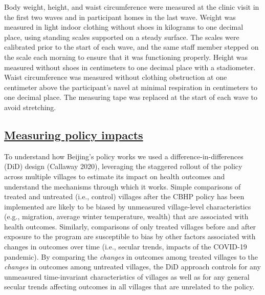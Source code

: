 \documentclass[
  letterpaper,
  DIV=11,
  numbers=noendperiod]{scrartcl}
\providecommand{\DIFadd}[1]{{\protect\color{blue}\underline{#1}}} %
\providecommand{\DIFaddbegin}{} %
\providecommand{\DIFaddend}{} %
\providecommand{\DIFdelbegin}{} %
\providecommand{\DIFdelend}{} %
\newcommand{\DIFscaledelfig}{0.5}
\newlength{\DIFdelgraphicswidth} %
\newlength{\DIFdelgraphicsheight} %
\newcommand{\DIFaddincludegraphics}[2][]{{\color{blue}\fbox{\DIFOincludegraphics[#1]{#2}}}} %
\newcommand{\DIFdelincludegraphics}[2][]{%
\sbox{\DIFdelgraphicsbox}{\DIFOincludegraphics[#1]{#2}}%
\settoboxwidth{\DIFdelgraphicswidth}{\DIFdelgraphicsbox} %
\settoboxtotalheight{\DIFdelgraphicsheight}{\DIFdelgraphicsbox} %
\scalebox{\DIFscaledelfig}{%
\parbox[b]{\DIFdelgraphicswidth}{\usebox{\DIFdelgraphicsbox}\\[-\baselineskip] \rule{\DIFdelgraphicswidth}{0em}}\llap{\resizebox{\DIFdelgraphicswidth}{\DIFdelgraphicsheight}{%
\setlength{\unitlength}{\DIFdelgraphicswidth}%
\begin{picture}(1,1)%
\thicklines\linethickness{2pt} %
{\color[rgb]{1,0,0}\put(0,0){\framebox(1,1){}}}%
{\color[rgb]{1,0,0}\put(0,0){\line( 1,1){1}}}%
{\color[rgb]{1,0,0}\put(0,1){\line(1,-1){1}}}%
\end{picture}%
}\hspace*{3pt}}} %
} %
\DeclareRobustCommand{\DIFaddbegin}{\DIFOaddbegin \let\includegraphics\DIFaddincludegraphics} %
\DeclareRobustCommand{\DIFaddend}{\DIFOaddend \let\includegraphics\DIFOincludegraphics} %
\DeclareRobustCommand{\DIFdelbegin}{\DIFOdelbegin \let\includegraphics\DIFdelincludegraphics} %
\DeclareRobustCommand{\DIFdelend}{\DIFOaddend \let\includegraphics\DIFOincludegraphics} %
\begin{document}
Body weight, height, and waist circumference were measured at the clinic
visit in the first two waves and in participant homes in the last wave.
Weight was measured in light indoor clothing without shoes in kilograms
to one decimal place, using standing scales supported on a steady
surface. The scales were calibrated prior to the start of each wave, and
the same staff member stepped on the scale each morning to ensure that
it was functioning properly. Height was measured without shoes in
centimeters to one decimal place with a stadiometer. Waist circumference
was measured without clothing obstruction at one centimeter above the
participant's navel at minimal respiration in centimeters to one decimal
place. The measuring tape was replaced at the start of each wave to
avoid stretching.

\DIFdelbegin %
\DIFdelend \DIFaddbegin \subsection{\DIFadd{Measuring policy impacts}}\label{measuring-policy-impacts}
\DIFaddend 

To understand how Beijing's policy works we used a
difference-in-differences (DiD) design (Callaway 2020), leveraging the
staggered rollout of the policy across multiple villages to estimate its
impact on health outcomes and understand the mechanisms through which it
works. Simple comparisons of treated and untreated (i.e., control)
villages after the CBHP policy has been implemented are likely to be
biased by unmeasured village-level characteristics (e.g., migration,
average winter temperature, wealth) that are associated with health
outcomes. Similarly, comparisons of only treated villages before and
after exposure to the program are susceptible to bias by other factors
associated with changes in outcomes over time (i.e., secular trends,
impacts of the COVID-19 pandemic). By comparing the \emph{changes} in
outcomes among treated villages to the \emph{changes} in outcomes among
untreated villages, the DiD approach controls for any unmeasured
time-invariant characteristics of villages as well as for any general
secular trends affecting outcomes in all villages that are unrelated to
the policy.
\end{document}
